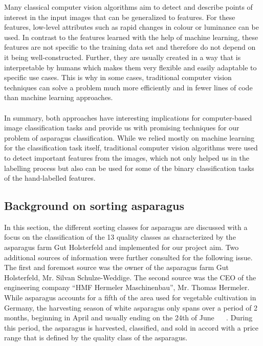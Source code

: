Many classical computer vision algorithms aim to detect and describe points of interest in the input images that can be generalized to features. For these features, low-level attributes such as rapid changes in colour or luminance can be used. In contrast to the features learned with the help of machine learning, these features are not specific to the training data set and therefore do not depend on it being well-constructed. Further, they are usually created in a way that is interpretable by humans which makes them very flexible and easily adaptable to specific use cases. This is why in some cases, traditional computer vision techniques can solve a  problem much more efficiently and in fewer lines of code than machine learning approaches. \\
\\
In summary, both approaches have interesting implications for computer-based image classification tasks and provide us with promising techniques for our problem of asparagus classification. While we relied mostly on machine learning for the classification task itself, traditional computer vision algorithms were used to detect important features from the images, which not only helped us in the labelling process but also can be used for some of the binary classification tasks of the hand-labelled features.


\subsection{Background on sorting asparagus}
\label{sec:BackgroundSortingAsparagus}

In this section, the different sorting classes for asparagus are discussed with a focus on the classification of the 13 quality classes as characterized by the asparagus farm Gut Holsterfeld and implemented for our project aim. Two additional sources of information were further consulted for the following issue. The first and foremost source was the owner of the asparagus farm Gut Holsterfeld, Mr. Silvan Schulze-Weddige. The second source was the CEO of the engineering company “HMF Hermeler Maschinenbau”, Mr. Thomas Hermeler. \\
While asparagus accounts for a fifth of the area used for vegetable cultivation in Germany, the harvesting season of white asparagus only spans over a period of 2 months, beginning in April and usually ending on the 24th of June ~\citep{spargelstatistik} ~\citep{nrw2018spargel}. During this period, the asparagus is harvested, classified, and sold in accord with a price range that is defined by the quality class of the asparagus. \\

